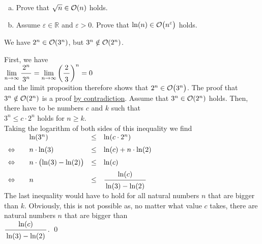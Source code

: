 \exercise
\begin{enumerate}[(a)]
\item Prove that $\sqrt{n} \in \mathcal{O}(n)$ holds.  
\item Assume $\varepsilon \in \mathbb{R}$ and $\varepsilon > 0$.
      Prove that $\ln(n) \in  \mathcal{O}\bigl(n^{\varepsilon}\bigr)$ holds. \eox
\end{enumerate}

\example
We have $2^n \in \mathcal{O}(3^n)$, but  $3^n \notin \mathcal{O}(2^n)$.
\ex

\proof
 First, we have \\[0.2cm]
\hspace*{1.3cm} 
$\displaystyle\lim\limits_{n \rightarrow \infty} \bruch{2^n}{3^n} = 
 \lim\limits_{n \rightarrow \infty} \left(\bruch{2}{3}\right)^n = 0$
\\[0.2cm]
and the limit proposition therefore shows that $2^n \in \mathcal{O}\bigl(3^n\bigr)$.  The proof that $3^n \notin
\mathcal{O}(2^n)$ is a  proof\linebreak
\href{https://en.wikipedia.org/wiki/Proof_by_contradiction}{by contradiction}.  Assume that 
$3^n \in \mathcal{O}(2^n)$ holds.  Then, there have to be numbers $c$ and $k$ such that 
\\[0.2cm]
\hspace*{1.3cm}
$3^n \leq c \cdot 2^n$ \quad holds for $n \geq k$. 
\\[0.2cm]
Taking the logarithm of both sides of this inequality we find 
\\[0.2cm]
\hspace*{1.3cm}
$
\begin{array}{llcl}
                & \ln(3^n) & \leq & \ln(c \cdot 2^n) \\[0.2cm]
\Leftrightarrow\quad &  n \cdot \ln(3) & \leq & \ln(c) + n \cdot \ln(2) \\[0.2cm]
\Leftrightarrow &  n \cdot \bigl(\ln(3) - \ln(2)\bigr) & \leq & \ln(c)  \\[0.2cm]
\Leftrightarrow &  n  & \leq & \bruch{\ln(c)}{\ln(3) - \ln(2)}          \\[0.2cm]
\end{array}
$
\\[0.2cm]
The last inequality would have to hold for all natural numbers $n$ that are bigger than $k$.  Obviously,
this is not possible as, no matter what value $c$ takes, there are natural numbers $n$ that are bigger than 
\\[0.2cm]
\hspace*{1.3cm}
$\bruch{\ln(c)}{\ln(3) - \ln(2)}$.
\qed

